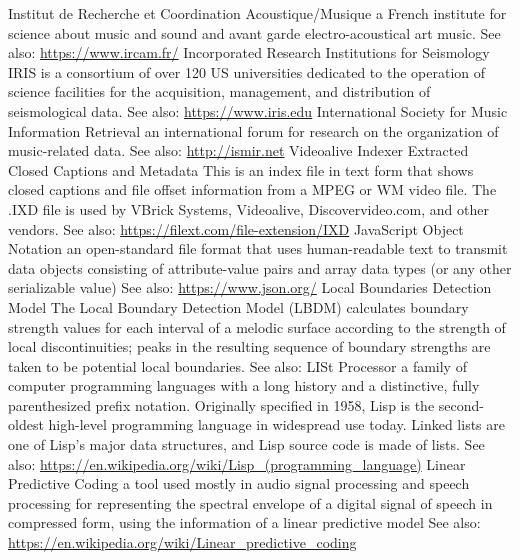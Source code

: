 	{Institut de Recherche et Coordination Acoustique/Musique}
	{a French institute for science about music and sound and avant garde electro-acoustical art music. See also: \url{https://www.ircam.fr/}}
	{Incorporated Research Institutions for Seismology}
	{IRIS is a consortium of over 120 US universities dedicated to the operation of science facilities for the acquisition, management, and distribution of seismological data. See also: \url{https://www.iris.edu}}
	{International Society for Music Information Retrieval}
	{an international forum for research on the organization of music-related data. See also: \url{http://ismir.net}}
	{Videoalive Indexer Extracted Closed Captions and Metadata}
	{This is an index file in text form that shows closed captions and file offset information from a MPEG or WM video file. The .IXD file is used by VBrick Systems, Videoalive, Discovervideo.com, and other vendors. See also: \url{https://filext.com/file-extension/IXD}}
	{JavaScript Object Notation}
	{an open-standard file format that uses human-readable text to transmit data objects consisting of attribute-value pairs and array data types (or any other serializable value) See also: \url{https://www.json.org/}}
	{Local Boundaries Detection Model}
	{The Local Boundary Detection Model (LBDM) calculates boundary strength values for each interval of a melodic surface according to the strength of local discontinuities; peaks in the resulting sequence of boundary strengths are taken to be potential local boundaries. See also: \url{} \cite{DBLP:conf/icmc/Cambouropoulos01}}
	{LISt Processor}
	{a family of computer programming languages with a long history and a distinctive, fully parenthesized prefix notation. Originally specified in 1958, Lisp is the second-oldest high-level programming language in widespread use today. Linked lists are one of Lisp's major data structures, and Lisp source code is made of lists. See also: \url{https://en.wikipedia.org/wiki/Lisp_(programming_language)}}
	{Linear Predictive Coding}
	{ a tool used mostly in audio signal processing and speech processing for representing the spectral envelope of a digital signal of speech in compressed form, using the information of a linear predictive model See also: \url{https://en.wikipedia.org/wiki/Linear_predictive_coding}}
